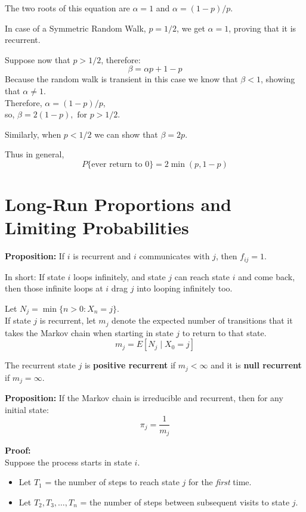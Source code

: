 The two roots of this equation are $\alpha = 1$ and $\alpha = (1-p)/p$.

In case of a Symmetric Random Walk, $p = 1/2$, we get $\alpha = 1$, proving that it is recurrent.

Suppose now that $p > 1/2$, therefore:
\[ \beta = \alpha p + 1 - p \]
Because the random walk is transient in this case we know that $\beta < 1$, showing that $\alpha \ne 1$. \\
Therefore, $\alpha = (1 - p)/p$, \\
so, $\beta = 2(1 - p), \text{ for } p > 1/2$.

Similarly, when $p < 1/2$ we can show that $\beta = 2p$.

Thus in general,
\[ P\{\text{ever return to } 0\} = 2 \min(p, 1 - p) \]

\vspace{0.5cm}
\section{\textcolor{secondary}{Long-Run Proportions and Limiting Probabilities}}

\textbf{Proposition:} If $i$ is recurrent and $i$ communicates with $j$, then $f_{ij} = 1$.

In short: If state $i$ loops infinitely, and state $j$ can reach state $i$ and come back, then those infinite loops at $i$ drag $j$ into looping infinitely too.

Let $N_j = \min\{n > 0 : X_n = j\}$. \\
If state $j$ is recurrent, let $m_j$ denote the expected number of transitions that it takes the Markov chain when starting in state $j$ to return to that state.
\[ m_j = E[N_j \mid X_0 = j] \]

The recurrent state $j$ is \textbf{positive recurrent} if $m_j < \infty$ and it is \textbf{null recurrent} if $m_j = \infty$.

\textbf{Proposition:} If the Markov chain is irreducible and recurrent, then for any initial state:
\[ \pi_j = \frac{1}{m_j} \]

\textbf{Proof:} \\
Suppose the process starts in state $i$.
\begin{itemize}
    \item Let $T_1$ = the number of steps to reach state $j$ for the \textit{first} time.
    \item Let $T_2, T_3, \dots, T_n$ = the number of steps between subsequent visits to state $j$.
\end{itemize}

